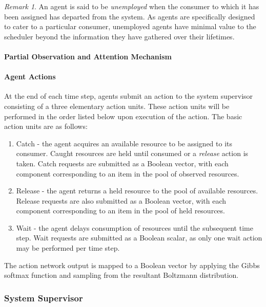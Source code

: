 \documentclass{article}
\theoremstyle{definition}
\theoremstyle{remark}
\newtheorem*{remark}{Remark}
\begin{document}
			\begin{remark}
				An agent is said to be \emph{unemployed} when the consumer to which it has been assigned has departed from the system. As agents are specifically designed to cater to a particular consumer, unemployed agents have minimal value to the scheduler beyond the information they have gathered over their lifetimes.
			\end{remark}

			\paragraph{Partial Observation and Attention Mechanism}

			\paragraph{Agent Actions}

			At the end of each time step, agents submit an action to the system supervisor consisting of a three elementary action units. These action units will be performed in the order listed below upon execution of the action. The basic action units are as follows:

			\begin{enumerate}
				\item Catch - the agent acquires an available resource to be assigned to its consumer. Caught resources are held until consumed or a \emph{release} action is taken. Catch requests are submitted as a Boolean vector, with each component corresponding to an item in the pool of observed resources.
				\item Release - the agent returns a held resource to the pool of available resources. Release requests are also submitted as a Boolean vector, with each component corresponding to an item in the pool of held resources.
				\item Wait - the agent delays consumption of resources until the subsequent time step. Wait requests are submitted as a Boolean scalar, as only one wait action may be performed per time step.
			\end{enumerate}

			The action network output is mapped to a Boolean vector by applying the Gibbs softmax function and sampling from the resultant Boltzmann distribution.

		\subsubsection{System Supervisor}
\end{document}
